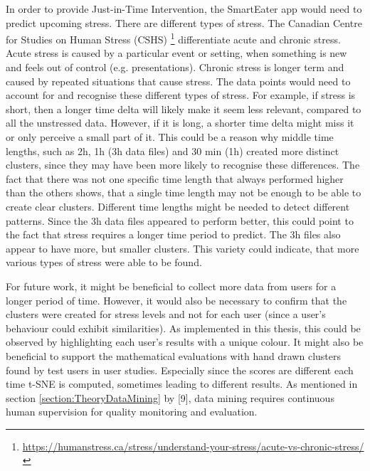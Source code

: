 In order to provide Just-in-Time Intervention, the SmartEater app would need to predict upcoming stress. There are different types of stress. The Canadian Centre for Studies on Human Stress (CSHS) \footnote{\url{https://humanstress.ca/stress/understand-your-stress/acute-vs-chronic-stress/}} differentiate acute and chronic stress. Acute stress is caused by a particular event or setting, when something is new and feels out of control (e.g. presentations). Chronic stress is longer term and caused by repeated situations that cause stress. The data points would need to account for and recognise these different types of stress. For example, if stress is short, then a longer time delta will likely make it seem less relevant, compared to all the unstressed data. However, if it is long, a shorter time delta might miss it or only perceive a small part of it. This could be a reason why middle time lengths, such as 2h, 1h (3h data files) and 30 min (1h) created more distinct clusters, since they may have been more likely to recognise these differences. The fact that there was not one specific time length that always performed higher than the others shows, that a single time length may not be enough to be able to create clear clusters. Different time lengths might be needed to detect different patterns. Since the 3h data files appeared to perform better, this could point to the fact that stress requires a longer time period to predict. The 3h files also appear to have more, but smaller clusters. This variety could indicate, that more various types of stress were able to be found.

For future work, it might be beneficial to collect more data from users for a longer period of time. However, it would also be necessary to confirm that the clusters were created for stress levels and not for each user (since a user's behaviour could exhibit similarities). As implemented in this thesis, this could be observed by highlighting each user's results with a unique colour. It might also be beneficial to support the mathematical evaluations with hand drawn clusters found by test users in user studies. Especially since the scores are different each time t-SNE is computed, sometimes leading to different results. As mentioned in section \ref{section:TheoryDataMining} by \textcite{DataMiningAndPredictiveAnalytics}[9], data mining requires continuous human supervision for quality monitoring and evaluation.

